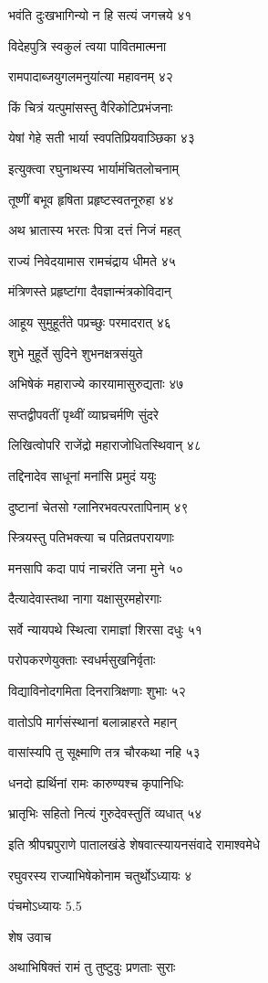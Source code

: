 भवंति दुःखभागिन्यो न हि सत्यं जगत्त्रये ४१

विदेहपुत्रि स्वकुलं त्वया पावितमात्मना

रामपादाब्जयुगलमनुयांत्या महावनम् ४२

किं चित्रं यत्पुमांसस्तु वैरिकोटिप्रभंजनाः

येषां गेहे सती भार्या स्वपतिप्रियवाञ्छिका ४३

इत्युक्त्वा रघुनाथस्य भार्यामंचितलोचनाम्

तूष्णीं बभूव हृषिता प्रहृष्टस्वतनूरुहा ४४

अथ भ्रातास्य भरतः पित्रा दत्तं निजं महत्

राज्यं निवेदयामास रामचंद्राय धीमते ४५

मंत्रिणस्ते प्रहृष्टांगा दैवज्ञान्मंत्रकोविदान्

आहूय सुमुहूर्तंते पप्रच्छुः परमादरात् ४६

शुभे मुहूर्ते सुदिने शुभनक्षत्रसंयुते

अभिषेकं महाराज्ये कारयामासुरुद्यताः ४७

सप्तद्वीपवतीं पृथ्वीं व्याघ्रचर्मणि सुंदरे

लिखित्वोपरि राजेंद्रो महाराजोधितस्थिवान् ४८

तद्दिनादेव साधूनां मनांसि प्रमुदं ययुः

दुष्टानां चेतसो ग्लानिरभवत्परतापिनाम् ४९

स्त्रियस्तु पतिभक्त्या च पतिव्रतपरायणाः

मनसापि कदा पापं नाचरंति जना मुने ५०

दैत्यादेवास्तथा नागा यक्षासुरमहोरगाः

सर्वे न्यायपथे स्थित्वा रामाज्ञां शिरसा दधुः ५१

परोपकरणेयुक्ताः स्वधर्मसुखनिर्वृताः

विद्याविनोदगमिता दिनरात्रिक्षणाः शुभाः ५२

वातोऽपि मार्गसंस्थानां बलान्नाहरते महान्

वासांस्यपि तु सूक्ष्माणि तत्र चौरकथा नहि ५३

धनदो ह्यर्थिनां रामः कारुण्यश्च कृपानिधिः

भ्रातृभिः सहितो नित्यं गुरुदेवस्तुतिं व्यधात् ५४

इति श्रीपद्मपुराणे पातालखंडे शेषवात्स्यायनसंवादे रामाश्वमेधे

रघुवरस्य राज्याभिषेकोनाम चतुर्थोऽध्यायः ४

पंचमोऽध्यायः 5.5

शेष उवाच

अथाभिषिक्तं रामं तु तुष्टुवुः प्रणताः सुराः

